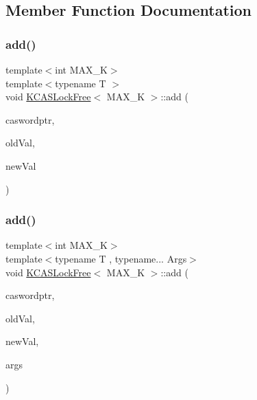 \subsection{Member Function Documentation}
\mbox{\label{classKCASLockFree_a01b56610d605c4ca1759c1f4c8c28d6e}} 
\subsubsection{\texorpdfstring{add()}{add()}\hspace{0.1cm}{\footnotesize\ttfamily [1/2]}}
{\footnotesize\ttfamily template$<$int M\+A\+X\+\_\+K$>$ \\
template$<$typename T $>$ \\
void \hyperlink{classKCASLockFree}{K\+C\+A\+S\+Lock\+Free}$<$ M\+A\+X\+\_\+K $>$\+::add (\begin{DoxyParamCaption}\item[{\hyperlink{structcasword}{casword}$<$ T $>$ $\ast$}]{caswordptr,  }\item[{T}]{old\+Val,  }\item[{T}]{new\+Val }\end{DoxyParamCaption})}

\mbox{\label{classKCASLockFree_ac12d23ced3ca079ca65ea8896405678a}} 
\subsubsection{\texorpdfstring{add()}{add()}\hspace{0.1cm}{\footnotesize\ttfamily [2/2]}}
{\footnotesize\ttfamily template$<$int M\+A\+X\+\_\+K$>$ \\
template$<$typename T , typename... Args$>$ \\
void \hyperlink{classKCASLockFree}{K\+C\+A\+S\+Lock\+Free}$<$ M\+A\+X\+\_\+K $>$\+::add (\begin{DoxyParamCaption}\item[{\hyperlink{structcasword}{casword}$<$ T $>$ $\ast$}]{caswordptr,  }\item[{T}]{old\+Val,  }\item[{T}]{new\+Val,  }\item[{Args...}]{args }\end{DoxyParamCaption})}

